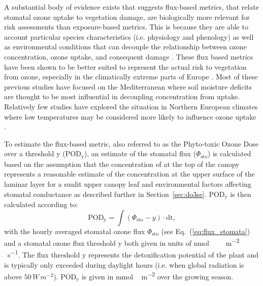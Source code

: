 \documentclass[bg, manuscript]{copernicus}
\begin{document}
A substantial body of evidence exists that suggests flux-based metrics, that relate stomatal ozone uptake to vegetation damage, are biologically more relevant for risk assessments than exposure-based metrics. This is because they are able to account particular species characteristics (i.e. physiology and phenology) as well as environmental conditions that can decouple the relationship between ozone concentration, ozone uptake, and consequent damage \citep{PT:Emberson2020}. These flux based metrics have been shown to be better suited to represent the actual risk to vegetation from ozone, especially in the climatically extreme parts of Europe \citep{EP:Simpson2007,GCB:Mills2011,ICP:MappingManual2017}. Most of these previous studies have focused on the Mediterranean where soil moisture deficits are thought to be most influential in decoupling concentration from uptake. Relatively few studies have explored the situation in Northern European climates where low temperatures may be considered more likely to influence ozone uptake \citep[e.g.]{iF:Juran2018}.

To estimate the flux-based metric, also referred to as the Phyto-toxic Ozone Dose over a threshold y ($\mathrm{POD_y}$), an estimate of the stomatal  flux ($\Phi_\mathrm{sto}$) is calculated based on the assumption that the concentration of  at the top of the canopy represents a reasonable estimate of the concentration at the upper surface of the laminar layer for a sunlit upper canopy leaf and environmental factors affecting stomatal conductance as described further in Section~\ref{sec:do3se}. $\mathrm{POD_y}$ is then calculated according to:
%
\begin{equation}
  \mathrm{POD_y} = \int{(\Phi_\mathrm{sto}-y)\cdot \mathrm{dt}},
  \label{eq:pod}
\end{equation}
%
with the hourly averaged stomatal ozone flux $\Phi_\mathrm{sto}$ (see Eq.~(\ref{eq:flux_stomata}) and a stomatal ozone flux threshold $\mathrm{y}$ both given in units of \unit{nmol\,\,m^{-2}\,\,s^{-1}}. The flux threshold $\mathrm{y}$ represents the detoxification potential of the plant and is typically only exceeded during daylight hours (i.e. when global radiation is above $50\,\unit{W\,m^{-2}}$). $\mathrm{POD_y}$ is given in \unit{mmol\,m^{-2}} over the growing season.
\end{document}
